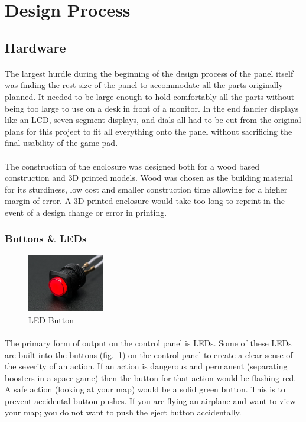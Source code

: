 \documentclass[12pt,a4paper]{article}
\begin{document}
	\section{Design Process}
		\subsection{Hardware}
			\paragraph{}
			The largest hurdle during the beginning of the design process of the panel itself was finding the rest size of the panel to accommodate all the parts originally planned. It needed to be large enough to hold comfortably all the parts without being too large to use on a desk in front of a monitor. In the end fancier displays like an \gls{LCD}, seven segment displays, and dials all had to be cut from the original plans for this project to fit all everything onto the panel without sacrificing the final usability of the game pad.
			\paragraph{}
			The construction of the enclosure was designed both for a wood based construction and 3D printed models. Wood was chosen as the building material for its sturdiness, low cost and smaller construction time allowing for a higher margin of error. A 3D printed enclosure would take too long to reprint in the event of a design change or error in printing.
		\newpage
		\subsubsection{Buttons \& \glspl{LED}}
			\begin{figure}
				\vspace*{-0.5cm}
    			\centering
    			\includegraphics[width=0.3\textwidth]{button}
    			\caption{LED Button}
    			\label{fig:button}
			\end{figure}
			\paragraph{}
			The primary form of output on the control panel is \glspl{LED}. Some of these \glspl{LED} are built into the buttons (fig.~\ref{fig:button}) on the control panel to create a clear sense of the severity of an action. If an action is dangerous and  permanent (separating boosters in a space game) then the button for that action would be flashing red. A safe action (looking at your map) would be a solid green button. This is to prevent accidental button pushes. If you are flying an airplane and want to view your map; you do not want to push the eject button accidentally.
\end{document}
